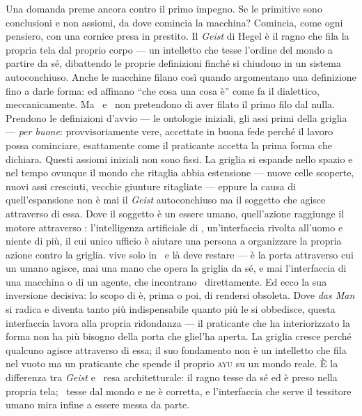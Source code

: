 Una domanda preme ancora contro il primo impegno. Se le primitive sono conclusioni
e non assiomi, da dove comincia la macchina? Comincia, come ogni pensiero, con una
cornice presa in prestito. Il \emph{Geist} di Hegel \`e il ragno che fila la
propria tela dal proprio corpo --- un intelletto che tesse l'ordine del mondo a
partire da s\'e, dibattendo le proprie definizioni finch\'e si chiudono in un
sistema autoconchiuso. Anche le macchine filano cos\`i quando argomentano una
definizione fino a darle forma:  ed  affinano
``che cosa una cosa \`e'' come fa il dialettico, meccanicamente. Ma \physis\ e
\praxis\ non pretendono di aver filato il primo filo dal nulla. Prendono le
definizioni d'avvio --- le ontologie iniziali, gli assi primi della griglia ---
\emph{per buone}: provvisoriamente vere, accettate in buona fede perch\'e il lavoro
possa cominciare, esattamente come il praticante accetta la prima forma che
dichiara. Questi assiomi iniziali non sono fissi. La griglia si espande nello
spazio e nel tempo ovunque il mondo che ritaglia abbia estensione --- nuove celle
scoperte, nuovi assi cresciuti, vecchie giunture ritagliate --- eppure la causa di
quell'espansione non \`e mai il \emph{Geist} autoconchiuso ma il soggetto che
agisce attraverso di essa. Dove il soggetto \`e un essere umano, quell'azione
raggiunge il motore attraverso : l'intelligenza artificiale di
\praxis, un'interfaccia rivolta all'uomo e niente di pi\`u, il cui unico ufficio
\`e aiutare una persona a organizzare la propria azione contro la griglia.
 vive solo in \praxis\ e l\`a deve restare --- \`e la porta
attraverso cui un umano agisce, mai una mano che opera la griglia da s\'e, e mai
l'interfaccia di una macchina o di un agente, che incontrano \physis\
direttamente. Ed ecco la sua inversione decisiva: lo scopo di  \`e,
prima o poi, di rendersi obsoleta. Dove \emph{das Man} si radica e diventa tanto
pi\`u indispensabile quanto pi\`u le si obbedisce, questa interfaccia lavora alla
propria ridondanza --- il praticante che ha interiorizzato la forma non ha pi\`u
bisogno della porta che gliel'ha aperta. La griglia cresce perch\'e qualcuno agisce
attraverso di essa; il suo fondamento non \`e un intelletto che fila nel vuoto ma
un praticante che spende il proprio \textsc{ayu} su un mondo reale. \`E la
differenza tra \emph{Geist} e \physis\ resa architetturale: il ragno tesse da s\'e
ed \`e preso nella propria tela; \physis\ tesse dal mondo e ne \`e corretta, e
l'interfaccia che serve il tessitore umano mira infine a essere messa da parte.

